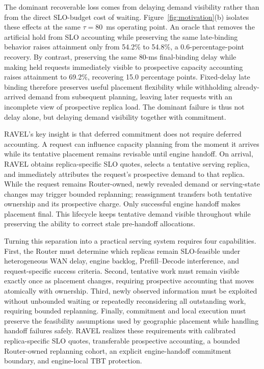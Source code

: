 The dominant recoverable loss comes from delaying demand visibility rather than
from the direct SLO-budget cost of waiting.
Figure~\ref{fig:motivation}(b) isolates these effects at the same
$\tau=80$~ms operating point.
An oracle that removes the artificial hold from SLO accounting while preserving
the same late-binding behavior raises attainment only from 54.2\% to 54.8\%,
a 0.6-percentage-point recovery.
By contrast, preserving the same 80-ms final-binding delay while making held
requests immediately visible to prospective capacity accounting raises
attainment to 69.2\%, recovering 15.0 percentage points.
Fixed-delay late binding therefore preserves useful placement flexibility while
withholding already-arrived demand from subsequent planning, leaving later
requests with an incomplete view of prospective replica load.
The dominant failure is thus not delay alone, but delaying demand visibility
together with commitment.

RAVEL's key insight is that deferred commitment does not require deferred
accounting.
A request can influence capacity planning from the moment it arrives while its
tentative placement remains revisable until engine handoff.
On arrival, RAVEL obtains replica-specific SLO quotes, selects a tentative
serving replica, and immediately attributes the request's prospective demand
to that replica.
While the request remains Router-owned, newly revealed demand or serving-state
changes may trigger bounded replanning; reassignment transfers both tentative
ownership and its prospective charge.
Only successful engine handoff makes placement final.
This lifecycle keeps tentative demand visible throughout while preserving the
ability to correct stale pre-handoff allocations.

Turning this separation into a practical serving system requires four
capabilities.
First, the Router must determine which replicas remain SLO-feasible under
heterogeneous WAN delay, engine backlog, Prefill--Decode interference, and
request-specific success criteria.
Second, tentative work must remain visible exactly once as placement changes,
requiring prospective accounting that moves atomically with ownership.
Third, newly observed information must be exploited without unbounded waiting
or repeatedly reconsidering all outstanding work, requiring bounded
replanning.
Finally, commitment and local execution must preserve the feasibility
assumptions used by geographic placement while handling handoff failures
safely.
RAVEL realizes these requirements with calibrated replica-specific SLO quotes,
transferable prospective accounting, a bounded Router-owned replanning cohort,
an explicit engine-handoff commitment boundary, and engine-local TBT
protection.

